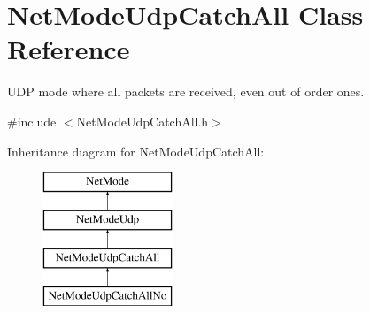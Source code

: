\hypertarget{class_net_mode_udp_catch_all}{
\section{NetModeUdpCatchAll Class Reference}
\label{class_net_mode_udp_catch_all}
}


UDP mode where all packets are received, even out of order ones.  




{\ttfamily \#include $<$NetModeUdpCatchAll.h$>$}

Inheritance diagram for NetModeUdpCatchAll:\begin{figure}[H]
\begin{center}
\leavevmode
\includegraphics[height=4.000000cm]{class_net_mode_udp_catch_all}
\end{center}
\end{figure}
